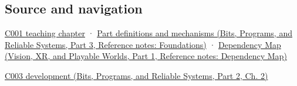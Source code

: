 \subsection{Source and navigation}\label{appendix-e4ccdbab8320-source-and-navigation}

\hypertarget{appendix-e4ccdbab8320-source-and-navigation}{}

\hyperref[01-foundations-i-ch001-from-a-signal-to-an-interpretation]{C001 teaching chapter} · \href{../01-Bits-Programs-and-Reliable-Systems-P03/main.pdf\#nameddest=appendix-fd090d982a15}{Part definitions and mechanisms (Bits, Programs, and Reliable Systems, Part 3, Reference notes: Foundations)} · \href{../07-Vision-XR-and-Playable-Worlds-P01/main.pdf\#nameddest=appendix-4ad47bdd269a}{Dependency Map (Vision, XR, and Playable Worlds, Part 1, Reference notes: Dependency Map)}

\href{../01-Bits-Programs-and-Reliable-Systems-P02/main.pdf\#nameddest=01-foundations-i-ch002-where-the-bytes-live}{C003 development (Bits, Programs, and Reliable Systems, Part 2, Ch. 2)}
